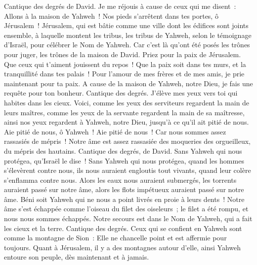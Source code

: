 \begin{multicols}{2}
\VerseOne{}Cantique des degrés de David. Je me réjouis à cause de ceux qui me disent~: Allons à la maison de Yahweh~!
Nos pieds s'arrêtent dans tes portes, ô Jérusalem~!
Jérusalem, qui est bâtie comme une ville dont les édifices sont joints ensemble,
à laquelle montent les tribus, les tribus de Yahweh, selon le témoignage d'Israël, pour célébrer le Nom de Yahweh.
Car c'est là qu'ont été posés les trônes pour juger, les trônes de la maison de David.
Priez pour la paix de Jérusalem. Que ceux qui t'aiment jouissent du repos~!
Que la paix soit dans tes murs, et la tranquillité dans tes palais~!
Pour l'amour de mes frères et de mes amis, je prie maintenant pour ta paix.
A cause de la maison de Yahweh, notre Dieu, je fais une requête pour ton bonheur.
\VerseOne{}Cantique des degrés. J'élève mes yeux vers toi qui habites dans les cieux.
Voici, comme les yeux des serviteurs regardent la main de leurs maîtres, comme les yeux de la servante regardent la main de sa maîtresse, ainsi nos yeux regardent à Yahweh, notre Dieu, jusqu'à ce qu'il ait pitié de nous.
Aie pitié de nous, ô Yahweh~! Aie pitié de nous~! Car nous sommes assez rassasiés de mépris~!
Notre âme est assez rassasiée des moqueries des orgueilleux, du mépris des hautains.
\VerseOne{}Cantique des degrés, de David. Sans Yahweh qui nous protégea, qu'Israël le dise~!
Sans Yahweh qui nous protégea, quand les hommes s'élevèrent contre nous,
ils nous auraient engloutis tout vivants, quand leur colère s'enflamma contre nous.
Alors les eaux nous auraient submergés, les torrents auraient passé sur notre âme,
alors les flots impétueux auraient passé sur notre âme.
Béni soit Yahweh qui ne nous a point livrés en proie à leurs dents~!
Notre âme s'est échappée comme l'oiseau du filet des oiseleurs~; le filet a été rompu, et nous nous sommes échappés.
Notre secours est dans le Nom de Yahweh, qui a fait les cieux et la terre.
\VerseOne{}Cantique des degrés. Ceux qui se confient en Yahweh sont comme la montagne de Sion~: Elle ne chancelle point et est affermie pour toujours.
Quant à Jérusalem, il y a des montagnes autour d'elle, ainsi Yahweh entoure son peuple, dès maintenant et à jamais.

\end{multicols}
